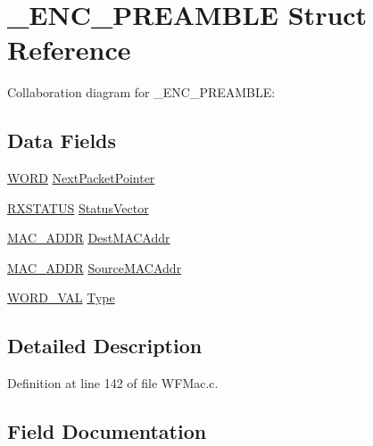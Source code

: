 \hypertarget{struct___e_n_c___p_r_e_a_m_b_l_e}{}\section{\+\_\+\+E\+N\+C\+\_\+\+P\+R\+E\+A\+M\+B\+L\+E Struct Reference}
\label{struct___e_n_c___p_r_e_a_m_b_l_e}


Collaboration diagram for \+\_\+\+E\+N\+C\+\_\+\+P\+R\+E\+A\+M\+B\+L\+E\+:
\subsection*{Data Fields}
\begin{DoxyCompactItemize}
\item 
\hyperlink{_generic_type_defs_8h_a2b0e863dadf920709ec53d9088ee7c91}{W\+O\+R\+D} \hyperlink{struct___e_n_c___p_r_e_a_m_b_l_e_ae8755c401d90421a605d67c1b1231fab}{Next\+Packet\+Pointer}
\item 
\hyperlink{union_r_x_s_t_a_t_u_s}{R\+X\+S\+T\+A\+T\+U\+S} \hyperlink{struct___e_n_c___p_r_e_a_m_b_l_e_a76baacc158c5cfc7f151a46bb51b7cc6}{Status\+Vector}
\item 
\hyperlink{_stack_tsk_8h_ad13a037a42c866ac11db19330b840589}{M\+A\+C\+\_\+\+A\+D\+D\+R} \hyperlink{struct___e_n_c___p_r_e_a_m_b_l_e_ab3be7c1d120c815f1acf7959050eea24}{Dest\+M\+A\+C\+Addr}
\item 
\hyperlink{_stack_tsk_8h_ad13a037a42c866ac11db19330b840589}{M\+A\+C\+\_\+\+A\+D\+D\+R} \hyperlink{struct___e_n_c___p_r_e_a_m_b_l_e_a4cce91226011afc994b97a630ac3fbf6}{Source\+M\+A\+C\+Addr}
\item 
\hyperlink{union_w_o_r_d___v_a_l}{W\+O\+R\+D\+\_\+\+V\+A\+L} \hyperlink{struct___e_n_c___p_r_e_a_m_b_l_e_ab2bf26921a49be66edb22ec5294bdfc9}{Type}
\end{DoxyCompactItemize}


\subsection{Detailed Description}


Definition at line 142 of file W\+F\+Mac.\+c.



\subsection{Field Documentation}
\hypertarget{struct___e_n_c___p_r_e_a_m_b_l_e_ab3be7c1d120c815f1acf7959050eea24}{}
